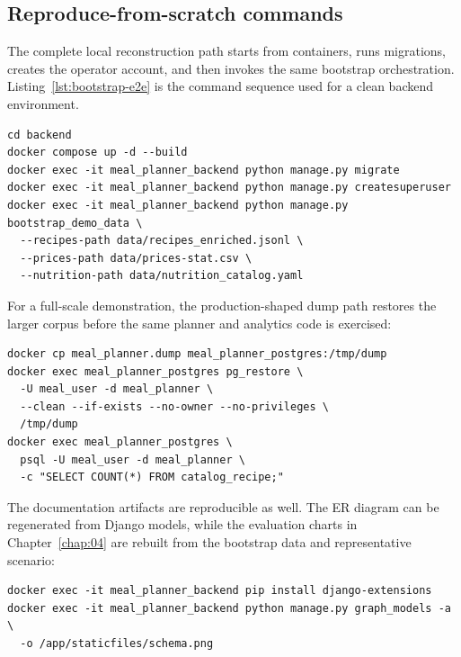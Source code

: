 \subsection{Reproduce-from-scratch commands}

The complete local reconstruction path starts from containers, runs migrations, creates the operator account, and then invokes the same bootstrap orchestration. Listing~\ref{lst:bootstrap-e2e} is the command sequence used for a clean backend environment.

\begin{lstlisting}[caption={End-to-end bootstrap from versioned data files.},label={lst:bootstrap-e2e}]
cd backend
docker compose up -d --build
docker exec -it meal_planner_backend python manage.py migrate
docker exec -it meal_planner_backend python manage.py createsuperuser
docker exec -it meal_planner_backend python manage.py bootstrap_demo_data \
  --recipes-path data/recipes_enriched.jsonl \
  --prices-path data/prices-stat.csv \
  --nutrition-path data/nutrition_catalog.yaml
\end{lstlisting}

For a full-scale demonstration, the production-shaped dump path restores the larger corpus before the same planner and analytics code is exercised:

\begin{lstlisting}[caption={Full-scale corpus restore from the production-shaped dump.},label={lst:restore-full-corpus}]
docker cp meal_planner.dump meal_planner_postgres:/tmp/dump
docker exec meal_planner_postgres pg_restore \
  -U meal_user -d meal_planner \
  --clean --if-exists --no-owner --no-privileges \
  /tmp/dump
docker exec meal_planner_postgres \
  psql -U meal_user -d meal_planner \
  -c "SELECT COUNT(*) FROM catalog_recipe;"
\end{lstlisting}

The documentation artifacts are reproducible as well. The ER diagram can be regenerated from Django models, while the evaluation charts in Chapter~\ref{chap:04} are rebuilt from the bootstrap data and representative scenario:

\begin{lstlisting}[caption={Regenerate the ER diagram for documentation.},label={lst:regen-er}]
docker exec -it meal_planner_backend pip install django-extensions
docker exec -it meal_planner_backend python manage.py graph_models -a \
  -o /app/staticfiles/schema.png
\end{lstlisting}

